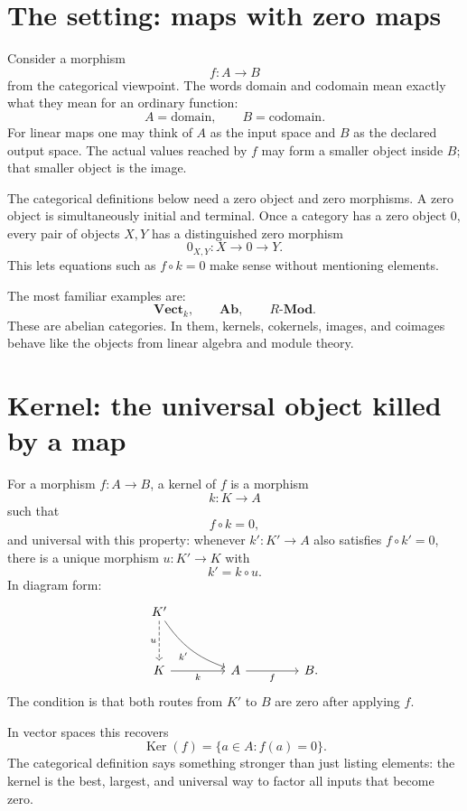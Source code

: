 
\section{The setting: maps with zero maps}

Consider a morphism
\[
  f:A\to B
\]
from the categorical viewpoint.  The words domain and codomain mean exactly what they mean for an ordinary function:
\[
  A=\text{domain},\qquad B=\text{codomain}.
\]
For linear maps one may think of \(A\) as the input space and \(B\) as the declared output space.  The actual values reached by \(f\) may form a smaller object inside \(B\); that smaller object is the image.

The categorical definitions below need a zero object and zero morphisms.  A zero object is simultaneously initial and terminal.  Once a category has a zero object \(0\), every pair of objects \(X,Y\) has a distinguished zero morphism
\[
  0_{X,Y}:X\to 0\to Y.
\]
This lets equations such as \(f\circ k=0\) make sense without mentioning elements.

The most familiar examples are:
\[
  \mathbf{Vect}_k,\qquad \mathbf{Ab},\qquad R\text{-}\mathbf{Mod}.
\]
These are abelian categories.  In them, kernels, cokernels, images, and coimages behave like the objects from linear algebra and module theory.

\section{Kernel: the universal object killed by a map}

For a morphism \(f:A\to B\), a kernel of \(f\) is a morphism
\[
  k:K\to A
\]
such that
\[
  f\circ k=0,
\]
and universal with this property: whenever \(k':K'\to A\) also satisfies \(f\circ k'=0\), there is a unique morphism \(u:K'\to K\) with
\[
  k'=k\circ u.
\]
In diagram form:
\[
\begin{tikzcd}[column sep=4.2em,row sep=3.2em]
K' \arrow[dr, "k'"', bend right=18] \arrow[d, dashed, "u"'] & \\
K \arrow[r, "k"'] & A \arrow[r, "f"'] & B .
\end{tikzcd}
\]
The condition is that both routes from \(K'\) to \(B\) are zero after applying \(f\).

In vector spaces this recovers
\[
  \operatorname{Ker}(f)=\{a\in A:f(a)=0\}.
\]
The categorical definition says something stronger than just listing elements: the kernel is the best, largest, and universal way to factor all inputs that become zero.

